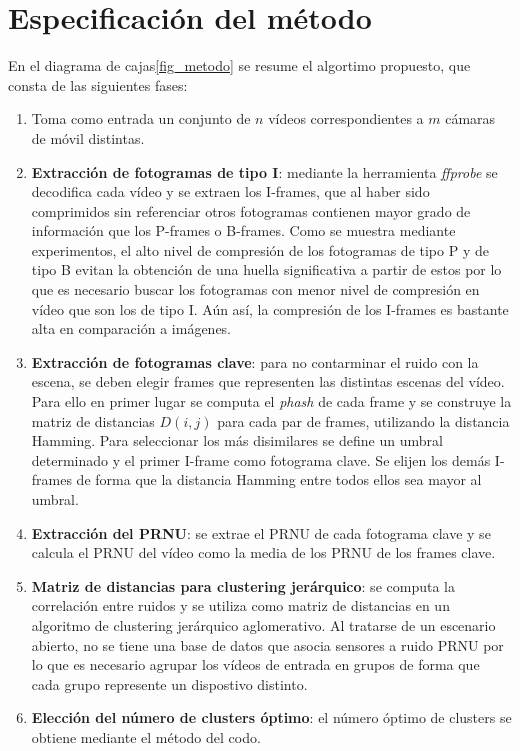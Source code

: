 \section{Especificación del método}
En el diagrama de cajas\ref{fig_metodo} se resume el algortimo propuesto, que consta de las siguientes fases:
\begin{enumerate}
\item Toma como entrada un conjunto de $n$ vídeos correspondientes a $m$ cámaras de móvil distintas.
\item \textbf{Extracción de fotogramas de tipo I}: mediante la herramienta \textit{ffprobe} se decodifica cada vídeo y se extraen los I-frames, que al haber sido comprimidos sin referenciar otros fotogramas contienen mayor grado de información que los P-frames o B-frames. Como se muestra mediante experimentos, el alto nivel de compresión de los fotogramas de tipo P y de tipo B evitan la obtención de una huella significativa a partir de estos por lo que es necesario buscar los fotogramas con menor nivel de compresión en vídeo que son los de tipo I. Aún así, la compresión de los I-frames es bastante alta en comparación a imágenes.
\item \textbf{Extracción de fotogramas clave}: para no contarminar el ruido con la escena, se deben elegir frames que representen las distintas escenas del vídeo. Para ello en primer lugar se computa el \textit{phash} de cada frame y se construye la matriz de distancias $D(i,j)$ para cada par de frames, utilizando la distancia Hamming. Para seleccionar los más disimilares se define un umbral determinado y el primer I-frame como fotograma clave. Se elijen los demás I-frames de forma que la distancia Hamming entre todos ellos sea mayor al umbral.
\item \textbf{Extracción del PRNU}: se extrae el PRNU de cada fotograma clave y se calcula el PRNU del vídeo como la media de los PRNU de los frames clave. 
\item \textbf{Matriz de distancias para clustering jerárquico}: se computa la correlación entre ruidos y se utiliza como matriz de distancias en un algoritmo de clustering jerárquico aglomerativo. Al tratarse de un escenario abierto, no se tiene una base de datos que asocia sensores a ruido PRNU por lo que es necesario agrupar los vídeos de entrada en grupos de forma que cada grupo represente un dispostivo distinto. 
\item \textbf{Elección del número de clusters óptimo}: el número óptimo de clusters se obtiene mediante el método del codo.
\end{enumerate}

